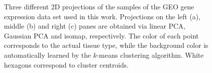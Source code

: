 \begin{figure}[!ht]
    \centering
    \hfill%
    \hfill%
    \caption{\small Three different 2D projections of the samples of the GEO gene expression data set used in this work. Projections on the left (a), middle (b) and right (c) panes are obtained via linear PCA, Gaussian PCA and isomap, respectively. The color of each point corresponds to the actual tissue type, while the background color is automatically learned by the $k$-means clustering algorithm. White hexagons correspond to cluster centroids.}\label{fig:scatter}
\end{figure}

